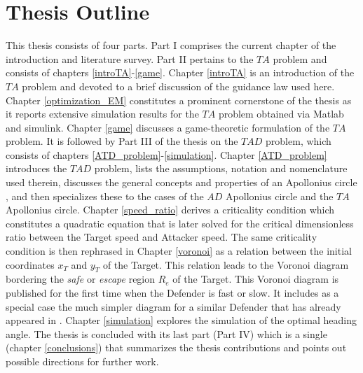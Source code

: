 \bigskip 

\section{Thesis Outline}
This thesis consists of four parts. Part I comprises the current chapter of the introduction and literature survey. Part II pertains to the $ TA $ problem and consists of chapters \ref{introTA}-\ref{game}. Chapter \ref{introTA} is an introduction of the $ TA $ problem and  devoted to a brief discussion of the guidance law used here. Chapter \ref{optimization_EM} constitutes a prominent cornerstone of the thesis as it reports extensive simulation results for the $ TA $ problem obtained via Matlab and simulink. Chapter \ref{game} discusses a game-theoretic formulation of the $ TA $ problem. It is followed by Part III of the thesis on the $ TAD $ problem, which consists of chapters \ref{ATD_problem}-\ref{simulation}. Chapter \ref{ATD_problem} introduces the $ TAD $ problem, lists the assumptions, notation and nomenclature used therein, discusses the general concepts and properties of an Apollonius circle \cite{ayoub2003proving,ayoub2006circle,partensky2008circle,fulton2015conflict}, and then specializes these to the cases of the $AD$ Apollonius circle and the $TA$ Apollonius circle. Chapter \ref{speed_ratio} derives a criticality condition which constitutes a quadratic equation that is later solved for the critical dimensionless ratio between the Target speed and Attacker speed. The same criticality condition is then rephrased in Chapter \ref{voronoi} as a relation between the initial coordinates $x_T$ and $y_T$ of the Target. This relation leads to the Voronoi diagram bordering the \textit{safe} or \textit{escape} region $R_e$ of the Target. This Voronoi diagram is published for the first time when the Defender is fast or slow. It includes as a special case the much simpler diagram for a similar Defender that has already appeared in \cite{garcia2015escape}. Chapter \ref{simulation} explores the simulation of the optimal heading angle. The thesis is concluded with its last part (Part IV) which is a single (chapter \ref{conclusions}) that summarizes the thesis contributions and points out possible directions for further work. 


